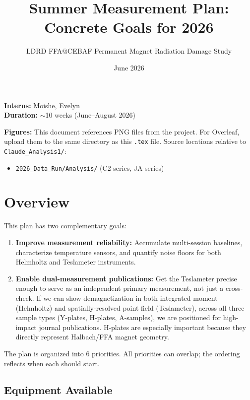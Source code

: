 \documentclass[11pt,letterpaper]{article}
\title{Summer Measurement Plan: Concrete Goals for 2026}
\author{LDRD FFA@CEBAF Permanent Magnet Radiation Damage Study}
\date{June 2026}
\begin{document}
\maketitle

\noindent\textbf{Interns:} Moishe, Evelyn \\
\textbf{Duration:} ${\sim}$10 weeks (June--August 2026)

\bigskip\noindent\textbf{Figures:} This document references PNG files from the
project. For Overleaf, upload them to the same directory as this \texttt{.tex}
file. Source locations relative to \texttt{Claude\_Analysis1/}:
\begin{itemize}[nosep]
  \item \texttt{2026\_Data\_Run/Analysis/} (C2-series, JA-series)
\end{itemize}

\tableofcontents
\newpage

\section{Overview}
\label{sec:overview}

This plan has two complementary goals:

\begin{enumerate}
  \item \textbf{Improve measurement reliability:} Accumulate multi-session
    baselines, characterize temperature sensors, and quantify noise floors for
    both Helmholtz and Teslameter instruments.

  \item \textbf{Enable dual-measurement publications:} Get the Teslameter
    precise enough to serve as an independent primary measurement, not just a
    cross-check. If we can show demagnetization in both integrated moment
    (Helmholtz) and spatially-resolved point field (Teslameter), across all
    three sample types (Y-plates, H-plates, A-samples), we are positioned for
    high-impact journal publications. H-plates are especially important because
    they directly represent Halbach/FFA magnet geometry.
\end{enumerate}

The plan is organized into 6 priorities. All priorities can overlap; the ordering
reflects when each should start.

\subsection{Equipment Available}
\end{document}
